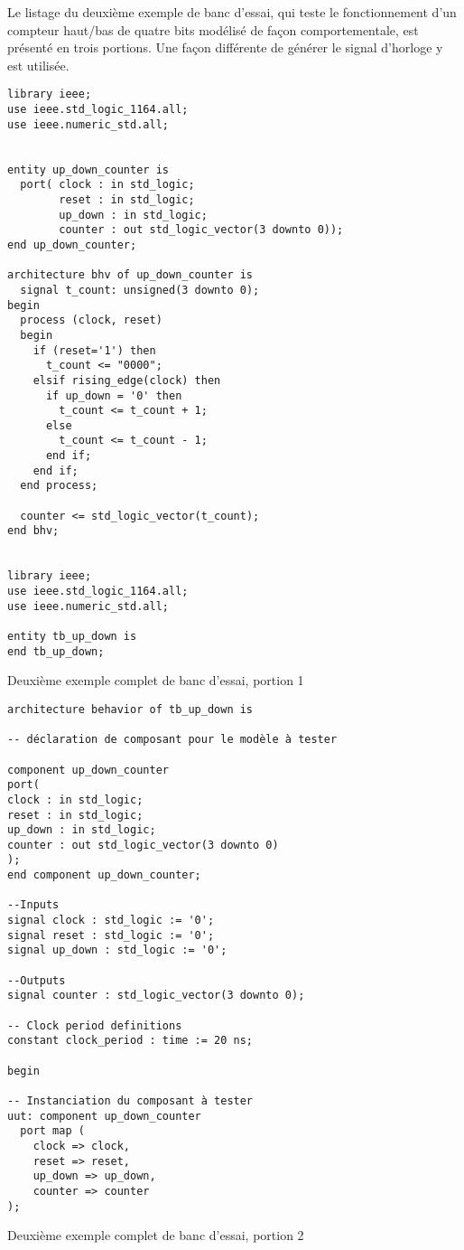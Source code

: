 \documentclass[11pt]{article}
\begin{document}
Le listage du deuxième exemple de banc d'essai, qui teste le
fonctionnement d'un compteur haut/bas de quatre bits modélisé de façon
comportementale, est présenté en trois portions. Une façon différente
de générer le signal d'horloge y est utilisée.

\begin{listing}[htbp]
\begin{verbatim}
library ieee;
use ieee.std_logic_1164.all;
use ieee.numeric_std.all;


entity up_down_counter is
  port( clock : in std_logic;
        reset : in std_logic;
        up_down : in std_logic;
        counter : out std_logic_vector(3 downto 0));
end up_down_counter;

architecture bhv of up_down_counter is
  signal t_count: unsigned(3 downto 0);
begin
  process (clock, reset)
  begin
    if (reset='1') then
      t_count <= "0000";
    elsif rising_edge(clock) then
      if up_down = '0' then
        t_count <= t_count + 1;
      else
        t_count <= t_count - 1;
      end if;
    end if;
  end process;

  counter <= std_logic_vector(t_count);
end bhv;


library ieee;
use ieee.std_logic_1164.all;
use ieee.numeric_std.all;

entity tb_up_down is
end tb_up_down;

\end{verbatim}
\caption{Deuxième exemple complet de banc d'essai, portion 1}
\end{listing}

\begin{listing}[htbp]
\begin{verbatim}
architecture behavior of tb_up_down is

-- déclaration de composant pour le modèle à tester

component up_down_counter
port(
clock : in std_logic;
reset : in std_logic;
up_down : in std_logic;
counter : out std_logic_vector(3 downto 0)
);
end component up_down_counter;

--Inputs
signal clock : std_logic := '0';
signal reset : std_logic := '0';
signal up_down : std_logic := '0';

--Outputs
signal counter : std_logic_vector(3 downto 0);

-- Clock period definitions
constant clock_period : time := 20 ns;

begin

-- Instanciation du composant à tester
uut: component up_down_counter
  port map (
    clock => clock,
    reset => reset,
    up_down => up_down,
    counter => counter
);

\end{verbatim}
\caption{Deuxième exemple complet de banc d'essai, portion 2}
\end{listing}
\end{document}

